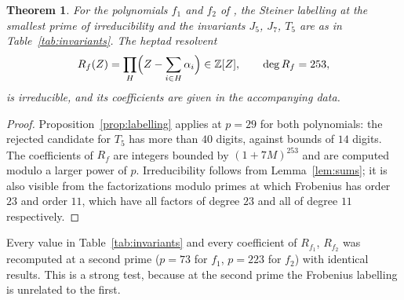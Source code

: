 \documentclass[11pt]{amsart}
\newtheorem{theorem}{Theorem}[section]
\theoremstyle{definition}
\newcommand{\ZZ}{\mathbb{Z}}
\begin{document}


\begin{theorem}\label{thm:invariants}
For the polynomials $f_1$ and $f_2$ of \cite[Examples 1.2 and 3.17]{HJLPPZ26}, the Steiner labelling at the smallest prime of irreducibility and the invariants $J_5$, $J_7$, $T_5$ are as in Table~\ref{tab:invariants}. The heptad resolvent
\[
R_f(Z)=\prod_{H}\Bigl(Z-\sum_{i\in H}\alpha_i\Bigr)\in\ZZ[Z],\qquad\deg R_f=253,
\]
is irreducible, and its coefficients are given in the accompanying data.
\end{theorem}
\begin{proof}
Proposition~\ref{prop:labelling} applies at $p=29$ for both polynomials: the rejected candidate for $T_5$ has more than $40$ digits, against bounds of $14$ digits. The coefficients of $R_f$ are integers bounded by $(1+7M)^{253}$ and are computed modulo a larger power of $p$. Irreducibility follows from Lemma~\ref{lem:sums}; it is also visible from the factorizations modulo primes at which Frobenius has order $23$ and order $11$, which have all factors of degree $23$ and all of degree $11$ respectively.
\end{proof}

Every value in Table~\ref{tab:invariants} and every coefficient of $R_{f_1}$, $R_{f_2}$ was recomputed at a second prime ($p=73$ for $f_1$, $p=223$ for $f_2$) with identical results. This is a strong test, because at the second prime the Frobenius labelling is unrelated to the first.
\end{document}
